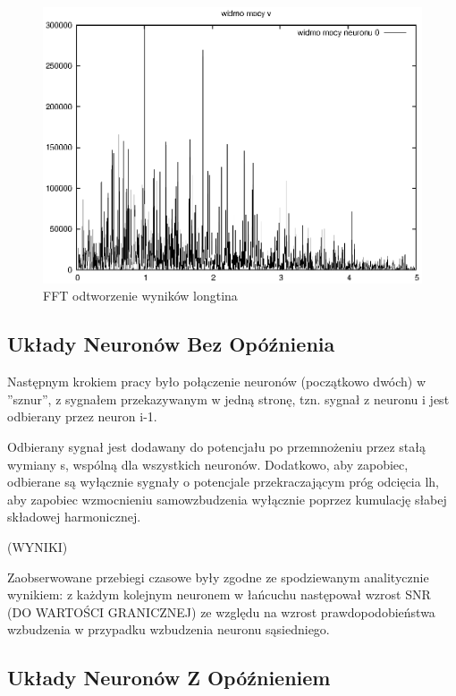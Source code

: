   \begin{figure}
    \includegraphics[width=140mm]{images/1neuron/3}
    \caption{FFT odtworzenie wyników longtina}
    \label{sym1fft}
  \end{figure}

  
  \subsection{Układy Neuronów Bez Opóźnienia}
  
  Następnym krokiem pracy było połączenie neuronów (początkowo dwóch) w ''sznur'', z sygnałem przekazywanym w jedną stronę, tzn. sygnał z neuronu i jest odbierany przez neuron i-1.
  
  Odbierany sygnał jest dodawany do potencjału po przemnożeniu przez stałą wymiany s, wspólną dla wszystkich neuronów. Dodatkowo, aby zapobiec, odbierane są wyłącznie sygnały o potencjale przekraczającym próg odcięcia lh, aby zapobiec wzmocnieniu samowzbudzenia wyłącznie poprzez kumulację słabej składowej harmonicznej.

  (WYNIKI)

  Zaobserwowane przebiegi czasowe były zgodne ze spodziewanym analitycznie wynikiem: z każdym kolejnym neuronem w łańcuchu następował wzrost SNR (DO WARTOŚCI GRANICZNEJ) ze względu na wzrost prawdopodobieństwa wzbudzenia w przypadku wzbudzenia neuronu sąsiedniego.


  
  \subsection{Układy Neuronów Z Opóźnieniem}
  
